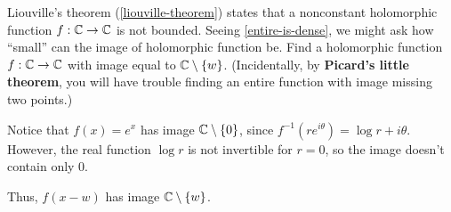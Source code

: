 \documentclass{homework}
\begin{document}
                                                                                                                                                  \begin{problem}
                                                                                                                                                    Liouville's theorem (\ref{liouville-theorem}) states that a
                                                                                                                                                      nonconstant holomorphic function $f : \mathbb{C} \to \mathbb{C}$ is not bounded.
                                                                                                                                                        Seeing \ref{entire-is-dense}, we might ask how ``small'' can the
                                                                                                                                                          image of holomorphic function be.  Find a holomorphic function
                                                                                                                                                            $f : \mathbb{C} \to \mathbb{C}$ with image equal to $\mathbb{C} \setminus \{w\}$.
                                                                                                                                                              (Incidentally, by \textbf{Picard's little theorem}, you will have
                                                                                                                                                                trouble finding an entire function with image missing two points.)
                                                                                                                                                                \end{problem}
                                                                                                                                                                \begin{solution}
                                                                                                                                                                Notice that $f(x) = e^x$ has image $\mathbb{C} \setminus \{0\}$, since $f^{-1}(re^{i\theta}) = \log r + i\theta$. However, the real function $\log r$ is not invertible for $r=0$, so the image doesn't contain only 0. 

                                                                                                                                                                Thus, $f(x-w)$ has image $\mathbb{C}\setminus \{w\}$.
                                                                                                                                                                \end{solution}
\end{document}
